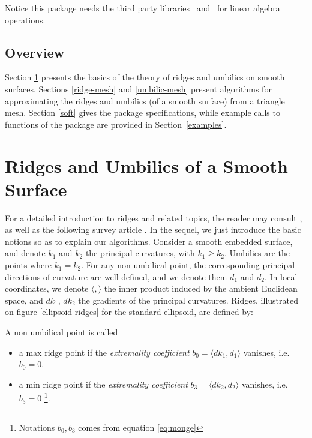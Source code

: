 Notice this package needs the third party libraries
\ccThirdPartyLapack\ and \ccThirdPartyBlas\ for linear algebra operations.

\subsection{Overview}

Section \ref{smooth} presents the basics of the theory of ridges and
umbilics on smooth surfaces. Sections \ref{ridge-mesh} and
\ref{umbilic-mesh} present algorithms for  approximating the ridges and
umbilics (of a smooth surface) from a triangle mesh. Section
\ref{soft} gives the package specifications, while example calls to
functions of the package are provided in Section~\ref{examples}.


\section{Ridges and Umbilics of a Smooth Surface}
\label{smooth}

For a detailed introduction to ridges and related topics, the reader
may consult 
\cite{cgal:hgygm-ttdpf-99,cgal:p-gd-01}, as well as
the following survey article \cite{cgal:cp-ssulc-05}.
In the sequel, we just introduce the basic notions so as to explain
our algorithms.  Consider a smooth embedded surface, and denote $k_1$
and $k_2$ the principal curvatures, with $k_1\geq k_2$. Umbilics are
the points where $k_1=k_2$.  For any non umbilical point, the
corresponding principal directions of curvature are well defined, and
we denote them $d_1$ and $d_2$.
In local coordinates, we denote $\langle , \rangle$ the inner product
induced by the ambient Euclidean space, and $dk_1$, $dk_2$ the
gradients of the principal curvatures. Ridges, illustrated on figure
\ref{ellipsoid-ridges} for the standard ellipsoid, are defined by:

\begin{definition}
\label{def:ridge-extrema}
A non umbilical point is called
\begin{itemize}
\item
a max ridge point if the {\em extremality coefficient} $b_0=\langle
dk_1,d_1 \rangle$ vanishes, i.e. $b_0=0$.

\item a min ridge point if the {\em extremality coefficient}
  $b_3=\langle dk_2,d_2 \rangle$ vanishes, i.e. $b_3=0$
  \footnote{Notations $b_0, b_3$ comes from equation \ref{eq:monge} }.
\end{itemize}
\end{definition}


